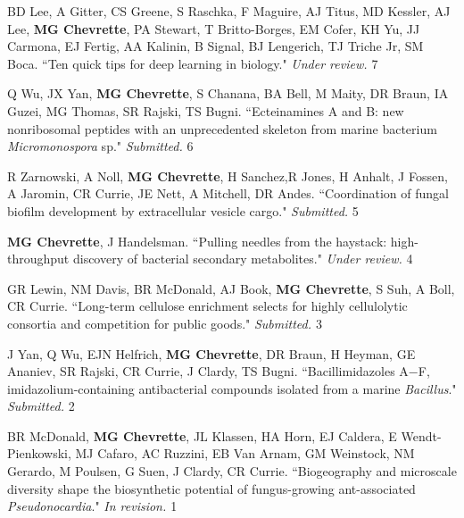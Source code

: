 
\begin{cvpubs}

\cvpub
{BD Lee, A Gitter, CS Greene, S Raschka, F Maguire, AJ Titus, MD Kessler, AJ Lee, \textbf{MG Chevrette}, PA Stewart, T Britto-Borges, EM Cofer, KH Yu, JJ Carmona, EJ Fertig, AA Kalinin, B Signal, BJ Lengerich, TJ Triche Jr, SM Boca. ``Ten quick tips for deep learning in biology." \textit{Under review. \textbf{}}}
{7}

\cvpub
{Q Wu, JX Yan, \textbf{MG Chevrette}, S Chanana, BA Bell, M Maity, DR Braun, IA Guzei, MG Thomas, SR Rajski, TS Bugni. ``Ecteinamines A and B: new nonribosomal peptides with an unprecedented skeleton from marine bacterium \textit{Micromonospora} sp." \textit{Submitted.}}
{6}

\cvpub
{R Zarnowski, A Noll, \textbf{MG Chevrette}, H Sanchez,R Jones, H Anhalt, J Fossen, A Jaromin, CR Currie, JE Nett, A Mitchell, DR Andes. ``Coordination of fungal biofilm development by extracellular vesicle cargo." \textit{Submitted.}}
{5}

\cvpub
{\textbf{MG Chevrette}, J Handelsman. ``Pulling needles from the haystack: high-throughput discovery of bacterial secondary metabolites." \textit{Under review.}}
{4}

\cvpub
{GR Lewin, NM Davis, BR McDonald, AJ Book, \textbf{MG Chevrette}, S Suh, A Boll, CR Currie. ``Long-term cellulose enrichment selects for highly cellulolytic consortia and competition for public goods." \textit{Submitted. \textbf{}}}
{3}

\cvpub
{J Yan, Q Wu, EJN Helfrich, \textbf{MG Chevrette}, DR Braun, H Heyman,  GE Ananiev, SR Rajski, CR Currie, J Clardy, TS Bugni. ``Bacillimidazoles A−F, imidazolium-containing antibacterial compounds isolated from a marine \textit{Bacillus}." \textit{Submitted.}}
{2}

\end{cvpubs} \begin{cvpubs}

\cvpub
{BR McDonald, \textbf{MG Chevrette}, JL Klassen, HA Horn, EJ Caldera, E Wendt-Pienkowski, MJ Cafaro, AC Ruzzini, EB Van Arnam, GM Weinstock, NM Gerardo, M Poulsen, G Suen, J Clardy, CR Currie. ``Biogeography and microscale diversity shape the biosynthetic potential of fungus-growing ant-associated \textit{Pseudonocardia}." \textit{In revision. \textbf{}}}
{1}

\end{cvpubs}


